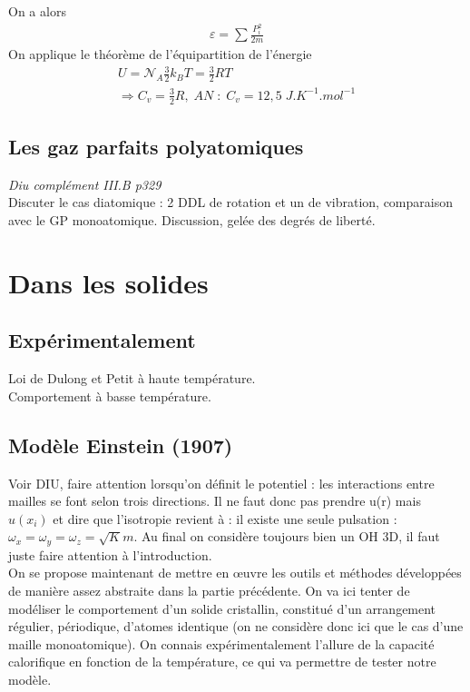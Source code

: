 \documentclass[12pt,prb,aps,epsf]{article}
\begin{document}
On a alors
\begin{eqnarray}
\varepsilon = \sum \frac{P_i^2}{2m}
\end{eqnarray}
On applique le théorème de l'équipartition de l'énergie
\begin{eqnarray}
U = \mathcal{N}_A \frac{3}{2}k_BT = \frac{3}{2}RT\\
\Longrightarrow C_v = \frac{3}{2}R,\; AN\;:\;C_v = 12,5\;J.K^{-1}.mol^{-1}
\end{eqnarray}
	
\subsection{Les gaz parfaits polyatomiques}
\textit{Diu complément III.B p329 }\\
Discuter le cas diatomique : 2 DDL de rotation et un de vibration,
comparaison avec le GP monoatomique. Discussion, gelée des degrés de liberté.

\section{Dans les solides}
\subsection{Expérimentalement}
Loi de Dulong et Petit à haute température.\\
Comportement à basse température.

\subsection{Modèle Einstein (1907)}
Voir DIU, faire attention lorsqu'on définit le potentiel : les interactions entre mailles se font selon trois directions. Il ne faut donc pas prendre u(r) mais $u(x_i)$ et dire que l'isotropie revient à : il existe une seule pulsation : $\omega_x=\omega _y=\omega _z=\sqrt{K}{m}$. Au final on considère toujours bien un OH 3D, il faut juste faire attention à l'introduction.\\

On se propose maintenant de mettre en œuvre les outils et méthodes développées de manière assez abstraite dans la partie précédente. On va ici tenter de modéliser le comportement d'un solide cristallin, constitué d'un arrangement régulier, périodique, d'atomes identique (on ne considère donc ici que le cas d'une maille monoatomique). On connais expérimentalement l'allure de la capacité calorifique en fonction de la température, ce qui va permettre de tester notre modèle.\\
\end{document}
